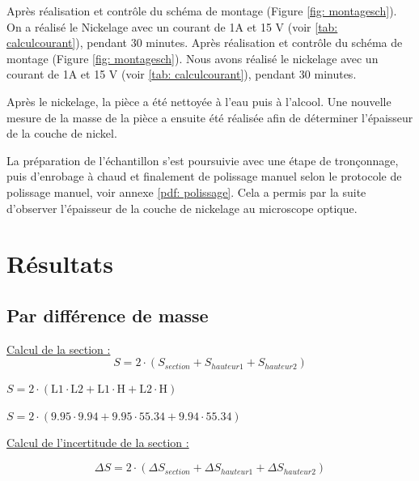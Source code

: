\vspace{0.3cm}
Après réalisation et contrôle du schéma de montage (Figure \ref{fig: montagesch}). On a réalisé le Nickelage avec un courant de 1A et 15 V (voir \ref{tab: calculcourant}), pendant 30 minutes.
Après réalisation et contrôle du schéma de montage (Figure \ref{fig: montagesch}). Nous avons réalisé le nickelage avec un courant de 1A et 15 V (voir \ref{tab: calculcourant}), pendant 30 minutes.

\vspace{0.3cm}
Après le nickelage, la pièce a été nettoyée à l'eau puis à l'alcool. Une nouvelle mesure de la masse de la pièce a ensuite été réalisée afin de déterminer l'épaisseur de la couche de nickel.

\vspace{0.3cm}
La préparation de l'échantillon s'est poursuivie avec une étape de tronçonnage, puis d'enrobage à chaud et finalement de polissage manuel selon le protocole de polissage manuel, voir annexe \ref{pdf: polissage}. Cela a permis par la suite d'observer l'épaisseur de la couche de nickelage au microscope optique.

\newpage
\section{Résultats}

\subsection{Par différence de masse}
\underline{Calcul de la section :}
\begin{equation}
    S = 2 \cdot (S_{section}+S_{hauteur1}+S_{hauteur2})
\end{equation}
\begin{center}
    $S = 2 \cdot (\text{L1} \cdot \text{L2} + \text{L1} \cdot \text{H} + \text{L2} \cdot \text{H}) $

    $S = 2 \cdot (9.95 \cdot 9.94 + 9.95 \cdot 55.34 + 9.94 \cdot 55.34) $
    

\end{center}

\underline{Calcul de l'incertitude de la section :}

\begin{equation}\label{eq: incertitudeSection}
    \Delta S = 2 \cdot (\Delta S_{section} + \Delta S_{hauteur1} + \Delta S_{hauteur2})
\end{equation}

